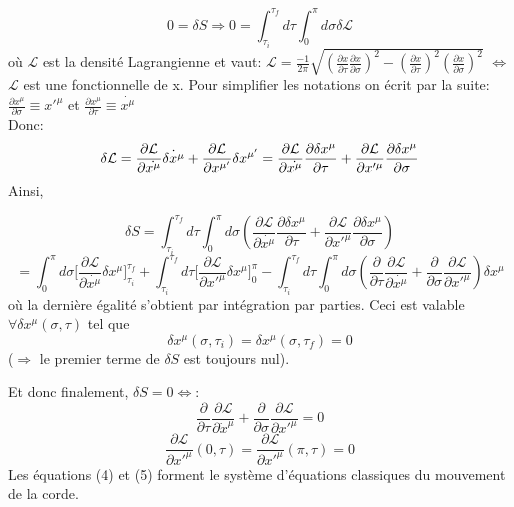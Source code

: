 \documentclass[a4paper,12pt]{article}
\def\xmu{x^\mu}
\def\CL{\mathcal{L}}
\begin{document}
\begin{equation}
0=\delta S
\Rightarrow
0=\int_{\tau_{i}}^{\tau_{f}}d\tau\int_{0}^{\pi}d\sigma\delta \CL
\end{equation}
où $\CL$ est la densité Lagrangienne et vaut: $\CL=\frac{-1}{2\pi}\sqrt{\left( \frac{\partial x}{\partial \tau}\frac{\partial x}{\partial \sigma}\right)^{2}-\left( \frac{\partial x}{\partial \tau}\right) ^{2}\left( \frac{\partial x}{\partial \sigma}\right) ^{2}}$ $\Leftrightarrow$ $\CL$ est une fonctionnelle de x.
Pour simplifier les notations on écrit par la suite: $ \frac{\partial x^{\mu}}{\partial \sigma}\equiv x'^{\mu}$ et $\frac{\partial x^{\mu}}{\partial \tau}\equiv \dot{x^{\mu}}$\\
Donc:
\begin{equation}
\delta \CL= \frac{\partial \CL}{\partial \dot{\xmu}}\dot{\delta \xmu}+\frac{\partial \CL}{\partial x^{\mu'}}\delta  x^{\mu'}\\
=\frac{\partial \CL}{\partial \dot{x^{\mu}}}\frac{\partial\delta x^{\mu}}{\partial \tau}+\frac{\partial \CL}{\partial x'^{\mu}}\frac{\partial\delta x^{\mu}}{\partial \sigma}
\end{equation}
Ainsi,

$$\delta S=\int_{\tau_{i}}^{\tau_{f}}d\tau\int_{0}^{\pi}d\sigma\left( \frac{\partial \CL}{\partial \dot{x^{\mu}}}\frac{\partial\delta x^{\mu}}{\partial \tau}+\frac{\partial \CL}{\partial x'^{\mu}}\frac{\partial\delta x^{\mu}}{\partial \sigma}\right) $$
$$=\int_{0}^{\pi}d\sigma \Big[\frac{\partial \CL}{\partial \dot{x^{\mu}}}\delta x^{\mu}\Big]^{\tau_{f}}_{\tau_{i}}+\int_{\tau_{i}}^{\tau_{f}}d\tau \Big[\frac{\partial \CL}{\partial x'^{\mu}}\delta x^{\mu}\Big]^{\pi}_{0}-\int_{\tau_{i}}^{\tau_{f}}d\tau\int_{0}^{\pi}d\sigma\left( \frac{\partial}{\partial \tau}\frac{\partial \CL}{\partial \dot{x^{\mu}}}+\frac{\partial}{\partial \sigma}\frac{\partial \CL}{\partial x'^{\mu}}\right)\delta x^{\mu}$$
où la dernière égalité s'obtient par intégration par parties.
Ceci est valable $\forall \delta x^{\mu}(\sigma,\tau)$ tel que 
$$\delta x^{\mu}(\sigma,\tau_{i})=\delta x^{\mu}(\sigma,\tau_{f})=0$$
($\Rightarrow$ le premier terme de $\delta S$ est toujours nul).

Et donc finalement, $\delta S=0 \Leftrightarrow$:
\begin{equation}
    \frac{\partial}{\partial \tau}\frac{\partial \CL}{\partial \dot x^{\mu}}+\frac{\partial}{\partial \sigma}\frac{\partial \CL}{\partial  x'^{\mu}}=0
\end{equation}
\begin{equation}
    \frac{\partial \CL}{\partial x'^{\mu}}(0, \tau)=\frac{\partial \CL}{\partial x'^{\mu}}(\pi, \tau)=0   
\end{equation}
Les équations (4) et (5) forment le système d'équations classiques du mouvement de la corde. 
\end{document}

